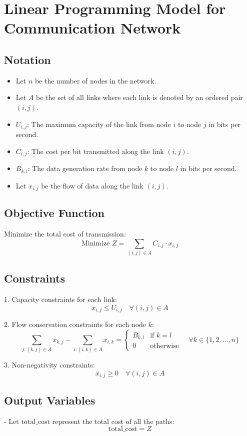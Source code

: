 \documentclass{article}
\begin{document}
\section*{Linear Programming Model for Communication Network}

\subsection*{Notation}
\begin{itemize}
    \item Let \( n \) be the number of nodes in the network.
    \item Let \( A \) be the set of all links where each link is denoted by an ordered pair \( (i, j) \).
    \item \( U_{i,j} \): The maximum capacity of the link from node \( i \) to node \( j \) in bits per second.
    \item \( C_{i,j} \): The cost per bit transmitted along the link \( (i, j) \).
    \item \( B_{k,l} \): The data generation rate from node \( k \) to node \( l \) in bits per second.
    \item Let \( x_{i,j} \) be the flow of data along the link \( (i,j) \).
\end{itemize}

\subsection*{Objective Function}
Minimize the total cost of transmission:
\[
\text{Minimize } Z = \sum_{(i,j) \in A} C_{i,j} \cdot x_{i,j}
\]

\subsection*{Constraints}
1. Capacity constraints for each link:
\[
x_{i,j} \leq U_{i,j} \quad \forall (i,j) \in A
\]

2. Flow conservation constraints for each node \( k \):
\[
\sum_{j: (k,j) \in A} x_{k,j} - \sum_{i: (i,k) \in A} x_{i,k} = \begin{cases} 
B_{k,l} & \text{if } k = l \\
0 & \text{otherwise}
\end{cases} \quad \forall k \in \{1, 2, \ldots, n\}
\]

3. Non-negativity constraints:
\[
x_{i,j} \geq 0 \quad \forall (i,j) \in A
\]

\subsection*{Output Variables}
- Let \( \text{total\_cost} \) represent the total cost of all the paths:
\[
\text{total\_cost} = Z
\]
\end{document}
